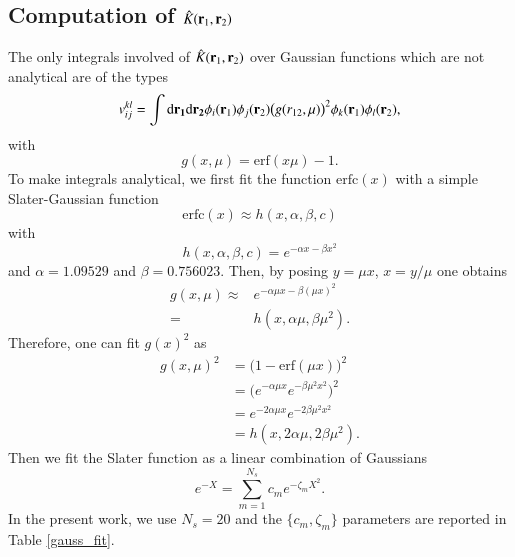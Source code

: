 \documentclass[aip,jcp,reprint,noshowkeys,superscriptaddress]{revtex4-1}
\newcommand{\bri}[1]{{\bf r}_{#1}}
\newcommand{\dr}[1]{\text{d}{\bf r_{#1}}}
\begin{document}
\subsection{Computation of $\hat{K}(\bri{1},\bri{2})$} 
\label{sec:integrals}
The only integrals involved of $\hat{K}(\bri{1},\bri{2})$ over Gaussian functions which are not analytical are of the types 
\begin{equation}
 \label{eq:k_ijkl}
 v_{ij}^{kl} = \int \dr{1} \dr{2} \phi_i(\bri{1}) \phi_j(\bri{2}) \big( g(r_{12},\mu) \big)^2  \phi_k(\bri{1}) \phi_l(\bri{2}),  
\end{equation}
with 
\begin{equation}
 g(x, \mu)= \text{erf}(x \mu) - 1.
\end{equation}
To make integrals analytical, we first fit the function $\text{erfc}(x)$ with a simple Slater-Gaussian function 
\begin{equation}
 \text{erfc}(x) \approx h(x,\alpha,\beta,c)
\end{equation}
with 
\begin{equation}
 h(x,\alpha,\beta,c) = e^{-\alpha x - \beta x^2}
\end{equation}
and $\alpha=1.09529$ and $\beta = 0.756023$. 
Then, by posing $y=\mu x$, $x=y/\mu$ one obtains 
\begin{equation}
 \label{fit_erf}
 \begin{aligned}
  g(x,\mu)  \approx & e^{-\alpha \mu x - \beta (\mu x)^2}\\ 
        =& h(x,\alpha \mu, \beta \mu^2).
 \end{aligned}
\end{equation}
Therefore, one can fit $g(x)^2$ as 
\begin{equation}
 \begin{aligned}
 g(x,\mu)^2&= \bigg( 1 - \text{erf}(\mu x) \bigg)^2\\
           &= \bigg( e^{-\alpha \mu x } e^{-\beta \mu^2 x^2}\bigg)^2 \\
           &= e^{-2\alpha  \mu x } e^{-2 \beta \mu^2 x^2} \\
           &= h(x,2 \alpha \mu, 2 \beta \mu^2).
 \end{aligned}
\end{equation}
Then we fit the Slater function as a linear combination of Gaussians 
\begin{equation}
 e^{-X} = \sum_{m=1}^{N_s} c_m e^{-\zeta_m X^2}. 
\end{equation}
In the present work, we use $N_s=20$ and the $\{c_m,\zeta_m\}$ parameters are reported in Table \ref{gauss_fit}.
\end{document}
